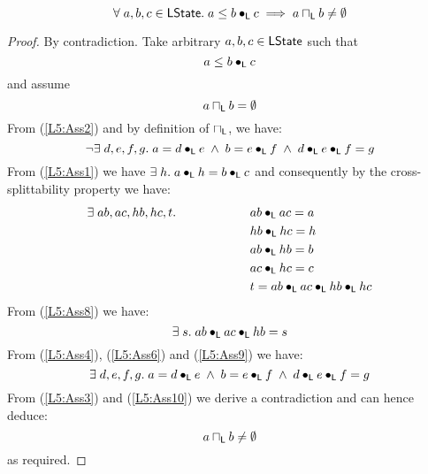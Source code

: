 %
%

%
%
\begin{lemma}[]\label{lem:nonEmptyOverlap}
%
\[
	\forall\; a, b, c \in \textsf{LState}.\; a \leq b \bullet_{\textsf{L}} c \implies a \sqcap_{\textsf{L}} b \not= \emptyset
\]
%
\begin{proof} By contradiction.
Take arbitrary $a, b, c \in \textsf{LState}$ such that 
%
\begin{equation}
	a \leq b \bullet_{\textsf{L}} c \label{L5:Ass1}
\end{equation}
%
and assume
%
\begin{equation}
	a \sqcap_{\textsf{L}} b = \emptyset \label{L5:Ass2}
\end{equation}
%
From (\ref{L5:Ass2}) and by definition of $\sqcap_{\textsf{L}}$, we have:
%
\begin{equation}
	\neg\exists\; d, e, f, g.\; a = d \bullet_{\textsf{L}} e \;\land\; b = e \bullet_{\textsf{L}} f \;\land\; d \bullet_{\textsf{L}} e \bullet_{\textsf{L}} f = g \label{L5:Ass3}
\end{equation}
%
From (\ref{L5:Ass1}) we have $\exists\; h.\; a \bullet_{\textsf{L}} h = b \bullet_{\textsf{L}} c$ and consequently by the cross-splittability property we have:
%
\begin{align}
	\exists\; ab, ac, hb, hc, t.\; \hspace*{2cm}&
	ab \bullet_{\textsf{L}} ac = a 	\label{L5:Ass4}\\
	& hb \bullet_{\textsf{L}} hc = h \label{L5:Ass5}\\
	& ab \bullet_{\textsf{L}} hb = b \label{L5:Ass6}\\
	& ac \bullet_{\textsf{L}} hc = c \label{L5:Ass7}\\
	& t = ab \bullet_{\textsf{L}} ac \bullet_{\textsf{L}} hb \bullet_{\textsf{L}} hc \label{L5:Ass8}
\end{align}
%
From (\ref{L5:Ass8}) we have:
%
\begin{equation}
	\exists\; s.\; ab \bullet_{\textsf{L}} ac \bullet_{\textsf{L}} hb = s \label{L5:Ass9}
\end{equation}
%
From (\ref{L5:Ass4}), (\ref{L5:Ass6}) and (\ref{L5:Ass9}) we have: 
%
\begin{equation}
	\exists\; d, e, f, g.\; a = d \bullet_{\textsf{L}} e \;\land\; b = e \bullet_{\textsf{L}} f \;\land\; d \bullet_{\textsf{L}} e \bullet_{\textsf{L}} f = g \label{L5:Ass10}
\end{equation}
%
From (\ref{L5:Ass3}) and (\ref{L5:Ass10}) we derive a contradiction and can hence deduce:
%
\begin{equation}
	a \sqcap_{\textsf{L}} b \not= \emptyset \nonumber
\end{equation}
%
as required.
\end{proof}
\end{lemma}
%
%

